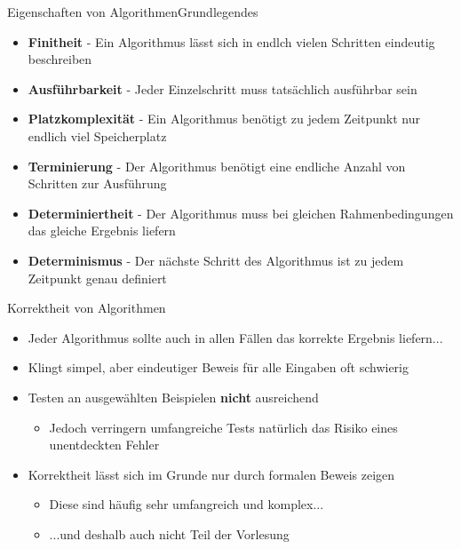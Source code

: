 
\begin{frame}{Eigenschaften von Algorithmen}{Grundlegendes}
    \begin{itemize}[<+->]
        \item \textbf{Finitheit} - Ein Algorithmus lässt sich in endlch vielen Schritten eindeutig beschreiben
        \item \textbf{Ausführbarkeit} - Jeder Einzelschritt muss tatsächlich ausführbar sein
        \item \textbf{Platzkomplexität} - Ein Algorithmus benötigt zu jedem Zeitpunkt nur endlich viel Speicherplatz
        \item \textbf{Terminierung} - Der Algorithmus benötigt eine endliche Anzahl von Schritten zur Ausführung
        \item \textbf{Determiniertheit} - Der Algorithmus muss bei gleichen Rahmenbedingungen das gleiche Ergebnis liefern
        \item \textbf{Determinismus} - Der nächste Schritt des Algorithmus ist zu jedem Zeitpunkt genau definiert
    \end{itemize}
\end{frame}

\begin{frame}{Korrektheit von Algorithmen}{}
    \begin{itemize}[<+->]
        \item Jeder Algorithmus sollte auch in allen Fällen das korrekte Ergebnis liefern...
        \item Klingt simpel, aber eindeutiger Beweis für alle Eingaben oft schwierig
        \item Testen an ausgewählten Beispielen \textbf{nicht} ausreichend
        \begin{itemize}
            \item Jedoch verringern umfangreiche Tests natürlich das Risiko eines unentdeckten Fehler
        \end{itemize}
        \item Korrektheit lässt sich im Grunde nur durch formalen Beweis zeigen
        \begin{itemize}
            \item Diese sind häufig sehr umfangreich und komplex...
            \item ...und deshalb auch nicht Teil der Vorlesung
        \end{itemize}
    \end{itemize}
\end{frame}

